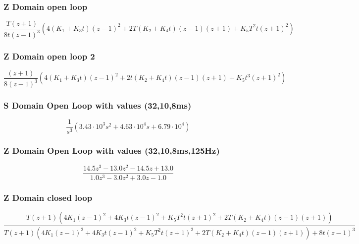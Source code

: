 \subsubsection{Z Domain open loop}

\begin{equation}
\frac{T\left(z + 1\right) }{8 t \left(z - 1\right)^{3}} \left(4(K_{1}  + K_{3} t)  \left(z - 1\right)^{2}  + 2 T \left(K_{2} + K_{4} t\right) \left(z - 1\right) \left(z + 1\right) + K_{5} T^{2} t \left(z + 1\right)^{2} \right)
\end{equation}

\subsubsection{Z Domain open loop 2}
\begin{equation}
\frac{\left(z + 1\right)}{8 \left(z - 1\right)^{3}} \left(4(K_{1}  + K_{3} t)  \left(z - 1\right)^{2} + 2 t \left(K_{2} + K_{4} t\right) \left(z - 1\right) \left(z + 1\right) + K_{5} t^{3} \left(z + 1\right)^{2}\right)
\end{equation}


\subsubsection{S Domain Open Loop with values (32,10,8ms)}
\begin{equation}
\frac{1}{s^{3}} \left(3.43 \cdot 10^{3} s^{2} + 4.63 \cdot 10^{4} s + 6.79 \cdot 10^{4}\right)
\end{equation}


\subsubsection{Z Domain Open Loop with values (32,10,8ms,125Hz)}
\begin{equation}
\frac{14.5 z^{3} - 13.0 z^{2} - 14.5 z + 13.0}{1.0 z^{3} - 3.0 z^{2} + 3.0 z - 1.0}
\end{equation}





\subsubsection{Z Domain closed loop}
\begin{equation}
\frac{T \left(z + 1\right) \left(4 K_{1} \left(z - 1\right)^{2} + 4 K_{3} t \left(z - 1\right)^{2} + K_{5} T^{2} t \left(z + 1\right)^{2} + 2 T \left(K_{2} + K_{4} t\right) \left(z - 1\right) \left(z + 1\right)\right)}{T \left(z + 1\right) \left(4 K_{1} \left(z - 1\right)^{2} + 4 K_{3} t \left(z - 1\right)^{2} + K_{5} T^{2} t \left(z + 1\right)^{2} + 2 T \left(K_{2} + K_{4} t\right) \left(z - 1\right) \left(z + 1\right)\right) + 8 t \left(z - 1\right)^{3}}
\end{equation}




